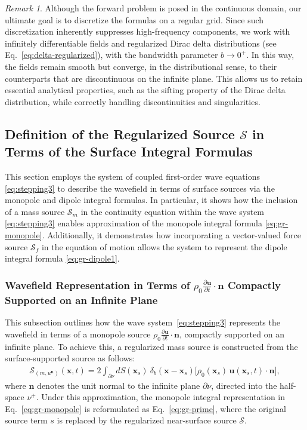\documentclass[11pt,reqno]{amsart}
\theoremstyle{remark}
\newtheorem{remark}{Remark}
\theoremstyle{italic_lemma}
\newcommand{\bx}{\boldsymbol{x}}
\newcommand{\bu}{\boldsymbol{u}}
\newcommand{\bn}{\boldsymbol{n}}
\begin{document}
\begin{remark}
Although the forward problem is posed in the continuous domain, our ultimate goal is to discretize the formulas on a regular grid. Since such discretization inherently suppresses high-frequency components, we work with infinitely differentiable fields and regularized Dirac delta distributions (see Eq.~\eqref{eq:delta-regularized}), with the bandwidth parameter \( b \to 0^+ \). In this way, the fields remain smooth but converge, in the distributional sense, to their counterparts that are discontinuous on the infinite plane. This allows us to retain essential analytical properties, such as the sifting property of the Dirac delta distribution, while correctly handling discontinuities and singularities.
\end{remark}




\subsection{Definition of the Regularized Source \( \mathcal{S} \) in Terms of the Surface Integral Formulas}


This section employs the system of coupled first-order wave equations \eqref{eq:stepping3} to describe the wavefield in terms of surface sources via the monopole and dipole integral formulas. In particular, it shows how the inclusion of a mass source $\mathcal{S}_m$ in the continuity equation within the wave system \eqref{eq:stepping3} enables approximation of the monopole integral formula \eqref{eq:gr-monopole}. Additionally, it demonstrates how incorporating a vector-valued force source $\boldsymbol{\mathcal{S}}_f$ in the equation of motion allows the system to represent the dipole integral formula \eqref{eq:gr-dipole1}.




\subsubsection{Wavefield Representation in Terms of \( \rho_0 \frac{\partial \bu}{\partial t} \cdot \bn \) Compactly Supported on an Infinite Plane}

This subsection outlines how the wave system~\eqref{eq:stepping3} represents the wavefield in terms of a monopole source \(  \rho_0 \frac{\partial \bu}{\partial t} \cdot \bn \), compactly supported on an infinite plane. To achieve this, a regularized mass source is constructed from the surface-supported source as follows:
\begin{align} \label{eq:mass-u}
    \mathcal{S}_{(m,u^{\bn})}(\bx, t) = 2
    \int_{\partial \nu} dS(\bx_s) \ \delta_b(\bx - \bx_s) \Big[ \rho_0(\bx_s)  \, \bu(\bx_s, t) \cdot \bn \Big],
\end{align}
where \( \bn \) denotes the unit normal to the infinite plane \( \partial \nu \), directed into the half-space \( \nu^+ \). Under this approximation, the monopole integral representation in Eq.~\eqref{eq:gr-monopole} is reformulated as Eq.~\eqref{eq:gr-prime}, where the original source term \( s \) is replaced by the regularized near-surface source \( \mathcal{S} \).
\end{document}
